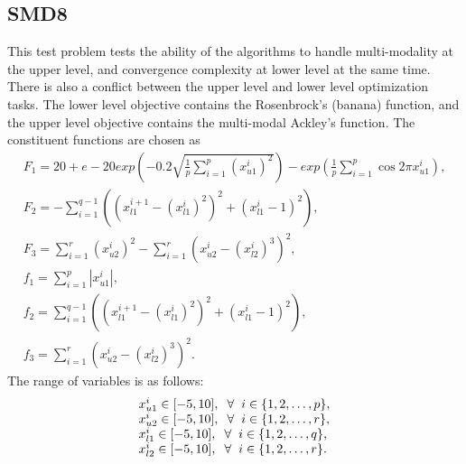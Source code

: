 \documentclass[twoside]{article}
\begin{document}
\subsection{SMD8}
This test problem tests the ability of the algorithms to handle multi-modality at the upper level, and convergence complexity at lower level at the same time. There is also a conflict between the upper level and lower level optimization tasks. The lower level objective contains the Rosenbrock's (banana) function, and the upper level objective contains the multi-modal Ackley's function. The constituent functions are chosen as
\begin{equation}
\begin{array}{l}
F_1 = 20 + e -20 exp\left( -0.2 \sqrt{\frac{1}{p}\sum_{i=1}^{p} (x_{u1}^{i})^2}\right) - exp\left(\frac{1}{p}\sum_{i=1}^{p} \cos 2 \pi x_{u1}^{i}\right),\\
F_2 = - \sum_{i=1}^{q-1} \left( \left(x_{l1}^{i+1} - \left(x_{l1}^{i}\right)^2\right)^2 + \left(x_{l1}^{i} - 1\right)^2 \right),\\
F_3 = \sum_{i=1}^{r} (x_{u2}^{i})^2 - \sum_{i=1}^{r} (x_{u2}^{i} - (x_{l2}^{i})^3)^2,\\
f_1 = \sum_{i=1}^{p} |x_{u1}^{i}|,\\
f_2 = \sum_{i=1}^{q-1} \left( \left(x_{l1}^{i+1} - \left(x_{l1}^{i}\right)^2\right)^2 + \left(x_{l1}^{i} - 1\right)^2 \right),\\
f_3 = \sum_{i=1}^{r} (x_{u2}^{i} - (x_{l2}^{i})^3)^2.
\end{array}
\end{equation}
The range of variables is as follows:
\begin{equation}
\begin{array}{l}
x_{u1}^{i} \in [-5,10], \hspace{2mm} \forall \hspace{2mm} i \in \{1,2,\ldots,p\},\\
x_{u2}^{i} \in [-5,10], \hspace{2mm} \forall \hspace{2mm} i \in \{1,2,\ldots,r\},\\
x_{l1}^{i} \in [-5,10], \hspace{2mm} \forall \hspace{2mm} i \in \{1,2,\ldots,q\},\\
x_{l2}^{i} \in [-5,10], \hspace{2mm} \forall \hspace{2mm} i \in \{1,2,\ldots,r\}.
\end{array}
\end{equation}
\end{document}
